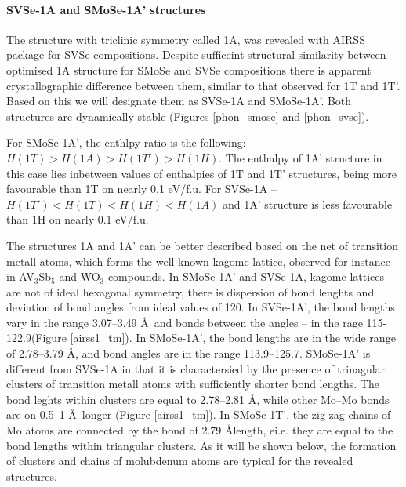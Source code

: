 \documentclass[a4paperm]{article}
\begin{document}
\paragraph{SVSe-1A and SMoSe-1A' structures}
The structure with triclinic symmetry called 1A, was revealed with AIRSS package for SVSe compositions.
Despite sufficeint structural similarity between optimised 1A structure for SMoSe and SVSe compositions there is apparent crystallographic difference between them, similar to that observed for 1T and 1T'.
Based on this we will designate them as SVSe-1A and SMoSe-1A'.
Both structures are dynamically stable (Figures \ref{phon_smose} and \ref{phon_svse}).

For SMoSe-1A', the enthlpy ratio is the following: $H(1T) > H(1A) > H(1T') > H(1H)$.
The enthalpy of 1A' structure in this case lies inbetween values of enthalpies of 1T and 1T' structures, being more favourable than 1T on nearly 0.1 eV/f.u.
For SVSe-1A -- $H(1T') < H(1T) < H(1H) < H(1A)$ and 1A' structure is less favourable than 1H on nearly 0.1 eV/f.u.


The structures 1A and 1A' can be better described based on the net of transition metall atoms, which forms the well known kagome lattice\cite{zhang2021_kagome}, observed for instance in AV$_3$Sb$_5$ \cite{ortiz2021} and WO$_3$ \cite{gerand1979} compounds.
In SMoSe-1A' and SVSe-1A, kagome lattices are not of ideal hexagonal symmetry, there is dispersion of bond lenghts and deviation of bond angles from ideal values of 120\textdegree.
In SVSe-1A', the bond lengths vary in the range 3.07--3.49 \AA\ and bonds between the angles – in the rage 115-122.9\textdegree (Figure \ref{airss1_tm}).
In SMoSe-1A', the bond lengths are in the wide range of 2.78--3.79 \AA, and bond angles are in the range 113.9--125.7\textdegree.
SMoSe-1A' is different from SVSe-1A in that it is charactersied by the presence of trinagular clusters of transition metall atoms with sufficiently shorter bond lengths.
The bond leghts within clusters are equal to 2.78--2.81 \AA, while other Mo--Mo bonds are on 0.5--1 \AA\ longer (Figure \ref{airss1_tm}).
In SMoSe-1T', the zig-zag chains of Mo atoms are connected by the bond of 2.79 \AA length, ei.e. they are equal to the bond lengths within triangular clusters.
As it will be shown below, the formation of clusters and chains of molubdenum atoms are typical for the revealed structures.
\end{document}
